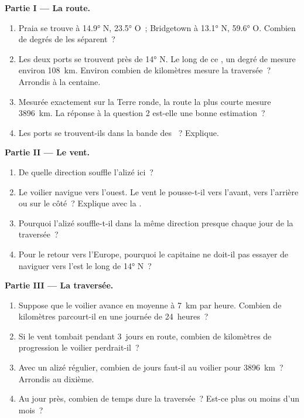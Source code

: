 \begin{problem}
\noindent\textbf{Partie I --- La route.}\par\nopagebreak
\begin{enumerate}[beginpenalty=10000]
  \item Praia se trouve à \ang{14.9} N, \ang{23.5} O~; Bridgetown à
        \ang{13.1} N, \ang{59.6} O. Combien de degrés de  les
        séparent~?
  \item Les deux ports se trouvent près de \ang{14} N. Le long de ce
        , un degré de  mesure environ \qty{108}{km}.
        Environ combien de kilomètres mesure la traversée~? Arrondis à la
        centaine.
  \item Mesurée exactement sur la Terre ronde, la route la plus courte
        mesure \qty{3896}{km}. La réponse à la question 2 est-elle une
        bonne estimation~?
  \item Les ports se trouvent-ils dans la bande des ~? Explique.
\end{enumerate}

\noindent\textbf{Partie II --- Le vent.}\par\nopagebreak
\begin{enumerate}[resume, beginpenalty=10000]
  \item De quelle direction souffle l'alizé ici~?
  \item Le voilier navigue vers l'ouest. Le vent le pousse-t-il vers
        l'avant, vers l'arrière ou sur le côté~? Explique avec la .
  \item Pourquoi l'alizé souffle-t-il dans la même direction presque
        chaque jour de la traversée~?
  \item Pour le retour vers l'Europe, pourquoi le capitaine ne doit-il pas
        essayer de naviguer vers l'est le long de \ang{14} N~?
\end{enumerate}

\noindent\textbf{Partie III --- La traversée.}\par\nopagebreak
\begin{enumerate}[resume, beginpenalty=10000]
  \item Suppose que le voilier avance en moyenne à \qty{7}{km} par heure.
        Combien de kilomètres parcourt-il en une journée de 24~heures~?
  \item Si le vent tombait pendant 3~jours en route, combien de
        kilomètres de progression le voilier perdrait-il~?
  \item Avec un alizé régulier, combien de jours faut-il au voilier pour
        \qty{3896}{km}~? Arrondis au dixième.
  \item Au jour près, combien de temps dure la traversée~? Est-ce plus ou
        moins d'un mois~?
\end{enumerate}
\end{problem}
